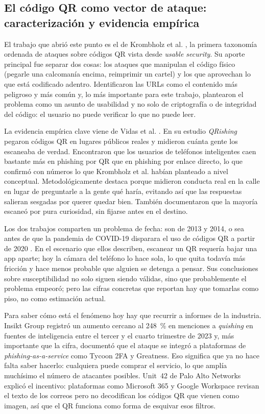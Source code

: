 \subsection{El código QR como vector de ataque: caracterización y evidencia empírica}

El trabajo que abrió este punto es el de Krombholz et al. \cite{krombholz2014qr},
la primera taxonomía ordenada de ataques sobre códigos QR vista desde
\emph{usable security}. Su aporte principal fue separar dos cosas: los ataques que
manipulan el código físico (pegarle una calcomanía encima, reimprimir un cartel) y los
que aprovechan lo que está codificado adentro. Identificaron las URLs como el
contenido más peligroso y más común y, lo más importante para este trabajo, plantearon
el problema como un asunto de usabilidad y no solo de criptografía o de integridad del
código: el usuario no puede verificar lo que no puede leer.

La evidencia empírica clave viene de Vidas et al. \cite{vidas2013qrishing}. En su
estudio \emph{QRishing} pegaron códigos QR en lugares públicos reales y midieron
cuánta gente los escaneaba de verdad. Encontraron que los usuarios de teléfonos
inteligentes caen bastante más en phishing por QR que en phishing por enlace directo,
lo que confirmó con números lo que Krombholz et al. habían planteado a nivel
conceptual. Metodológicamente destaca porque midieron conducta real en la calle en
lugar de preguntarle a la gente qué haría, evitando así que las respuestas salieran
sesgadas por querer quedar bien. También documentaron que la mayoría escaneó por pura
curiosidad, sin fijarse antes en el destino.

Los dos trabajos comparten un problema de fecha: son de 2013 y 2014, o sea antes de
que la pandemia de COVID-19 disparara el uso de códigos QR a partir de 2020
\cite{salahdine2019social}. En el escenario que ellos describen, escanear un QR
requería bajar una app aparte; hoy la cámara del teléfono lo hace sola, lo que quita
todavía más fricción y hace menos probable que alguien se detenga a pensar. Sus
conclusiones sobre susceptibilidad no solo siguen siendo válidas, sino que
probablemente el problema empeoró; pero las cifras concretas que reportan hay que
tomarlas como piso, no como estimación actual.

Para saber cómo está el fenómeno hoy hay que recurrir a informes de la industria.
Insikt Group \cite{insikt2024qrcode} registró un aumento cercano al 248~\% en menciones
a \emph{quishing} en fuentes de inteligencia entre el tercer y el cuarto trimestre de
2023 y, más importante que la cifra, documentó que el ataque se integró a plataformas
de \emph{phishing-as-a-service} como Tycoon 2FA y Greatness. Eso significa que ya no
hace falta saber hacerlo: cualquiera puede comprar el servicio, lo que amplía muchísimo
el número de atacantes posibles. Unit~42 de Palo Alto Networks \cite{unit42_2023qr}
explicó el incentivo: plataformas como Microsoft 365 y Google Workspace revisan el
texto de los correos pero no decodifican los códigos QR que vienen como imagen, así
que el QR funciona como forma de esquivar esos filtros.

